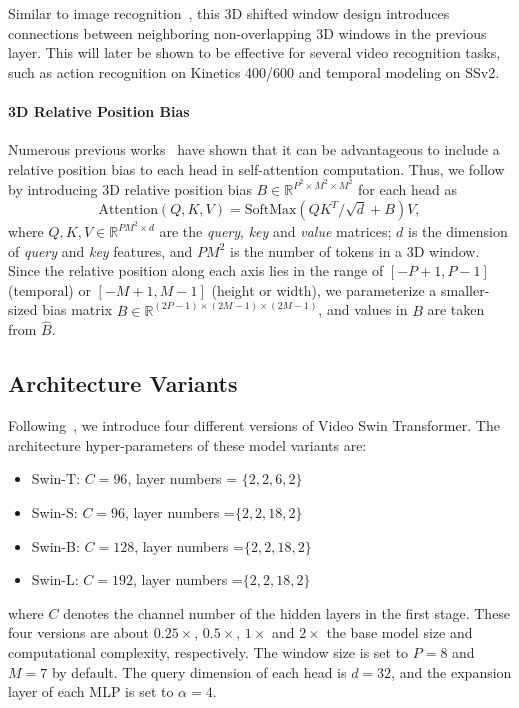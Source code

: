\documentclass{article}
\begin{document}
Similar to image recognition~\cite{liu2021swin}, this 3D shifted window design introduces connections between neighboring non-overlapping 3D windows in the previous layer. This will later be shown to be effective for several video recognition tasks, such as action recognition on Kinetics 400/600 and temporal modeling on SSv2.

\paragraph{3D Relative Position Bias} Numerous previous works~\cite{raffel2019t5,bao2020unilmv2,hu2018relation,hu2019localrelation} have shown that it can be advantageous to include a relative position bias to each head in self-attention computation. Thus, we follow~\cite{liu2021swin} by introducing 3D relative position bias $B \in \mathbb{R}^{P^2 \times M^2 \times M^2}$ for each head as
\begin{equation}
\label{eq.att}
    \text{Attention}(Q, K, V) = \text{SoftMax}(QK^T/\sqrt{d}+B)V,
\end{equation}
where $Q, K, V \in \mathbb{R}^{PM^2\times d}$ are the \emph{query}, \emph{key} and \emph{value} matrices; $d$ is the dimension of \emph{query} and \emph{key} features, and $PM^2$ is the number of tokens in a 3D window. Since the relative position along each axis lies in the range of  $[-P+1, P-1]$ (temporal) or $[-M+1, M-1]$ (height or width), we parameterize a smaller-sized bias matrix $\hat{B} \in \mathbb{R}^{(2P-1)\times(2M-1)\times (2M-1)}$, and values in $B$ are taken from $\hat{B}$.



\subsection{Architecture Variants}

Following~\cite{liu2021swin}, we introduce four different versions of Video Swin Transformer.
The architecture hyper-parameters of these model variants are:
\begin{itemize}
    \item Swin-T: $C=96$, layer numbers = $\{2, 2, 6, 2\}$
    \item Swin-S: $C=96$, layer numbers =$\{2, 2, 18, 2\}$
    \item Swin-B: $C=128$, layer numbers =$\{2, 2, 18, 2\}$
    \item Swin-L: $C=192$, layer numbers =$\{2, 2, 18, 2\}$ 
\end{itemize}
where $C$ denotes the channel number of the hidden layers in the first stage. 
These four versions are about $0.25\times$, $0.5\times$, $1\times$ and $2\times$ the base model size and computational complexity, respectively. The window size is set to $P=8$ and $M=7$ by default. The query dimension of each head is $d=32$, and the expansion layer of each MLP is set to $\alpha=4$. 
\end{document}
